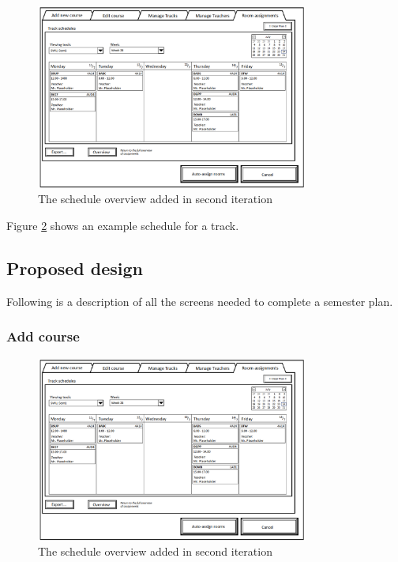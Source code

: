 \begin{figure}[htb]
\begin{center}
\leavevmode
\includegraphics[width=0.8\textwidth]{images/sem2_room_sche}
\end{center}
\caption{The schedule overview added in second iteration}
\label{fig:sem2_room_sche}
\end{figure}

Figure \ref{fig:sem2_room_sche} shows an example schedule for a track.


\subsection{Proposed design}
\label{subsec:proposed_design_sem}

Following is a description of all the screens needed to complete a semester plan.

\subsubsection{Add course}
\begin{figure}[htb]
\begin{center}
\leavevmode
\includegraphics[width=0.8\textwidth]{images/sem2_room_sche}
\end{center}
\caption{The schedule overview added in second iteration}
\label{fig:sem2_room_sche}
\end{figure}





